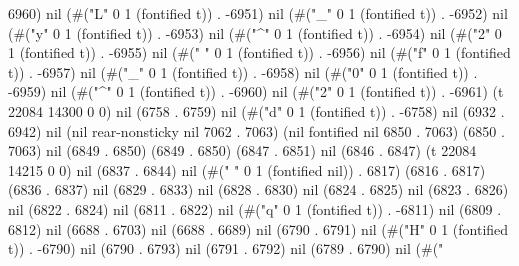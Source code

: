 6960) nil (#("L" 0 1 (fontified t)) . -6951) nil (#("_" 0 1 (fontified t)) . -6952) nil (#("y" 0 1 (fontified t)) . -6953) nil (#("^" 0 1 (fontified t)) . -6954) nil (#("2" 0 1 (fontified t)) . -6955) nil (#(" " 0 1 (fontified t)) . -6956) nil (#("f" 0 1 (fontified t)) . -6957) nil (#("_" 0 1 (fontified t)) . -6958) nil (#("0" 0 1 (fontified t)) . -6959) nil (#("^" 0 1 (fontified t)) . -6960) nil (#("2" 0 1 (fontified t)) . -6961) (t 22084 14300 0 0) nil (6758 . 6759) nil (#("d" 0 1 (fontified t)) . -6758) nil (6932 . 6942) nil (nil rear-nonsticky nil 7062 . 7063) (nil fontified nil 6850 . 7063) (6850 . 7063) nil (6849 . 6850) (6849 . 6850) (6847 . 6851) nil (6846 . 6847) (t 22084 14215 0 0) nil (6837 . 6844) nil (#(" " 0 1 (fontified nil)) . 6817) (6816 . 6817) (6836 . 6837) nil (6829 . 6833) nil (6828 . 6830) nil (6824 . 6825) nil (6823 . 6826) nil (6822 . 6824) nil (6811 . 6822) nil (#("q" 0 1 (fontified t)) . -6811) nil (6809 . 6812) nil (6688 . 6703) nil (6688 . 6689) nil (6790 . 6791) nil (#("H" 0 1 (fontified t)) . -6790) nil (6790 . 6793) nil (6791 . 6792) nil (6789 . 6790) nil (#("
